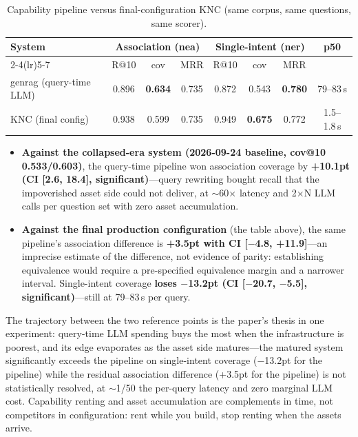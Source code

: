 \documentclass[sigconf,nonacm]{acmart}
\begin{document}
\begin{table}[!t]
\centering
\caption{Capability pipeline versus final-configuration KNC (same
corpus, same questions, same scorer).}
\label{tab:genrag}
\small
\begin{tabular}{lccccccc}
\toprule
\multirow{2}{*}{System} & \multicolumn{3}{c}{Association (nea)} & \multicolumn{3}{c}{Single-intent (ner)} & \multirow{2}{*}{p50} \\
\cmidrule(lr){2-4}\cmidrule(lr){5-7}
 & R@10 & cov & MRR & R@10 & cov & MRR &  \\
\midrule
genrag (query-time LLM) & 0.896 & \textbf{0.634} & 0.735 & 0.872 & 0.543 & \textbf{0.780} & 79--83\,s \\
KNC (final config) & 0.938 & 0.599 & 0.735 & 0.949 & \textbf{0.675} & 0.772 & 1.5--1.8\,s \\
\bottomrule
\end{tabular}
\end{table}

\begin{itemize}
\item \textbf{Against the collapsed-era system (2026-09-24 baseline,
cov@10 0.533/0.603)}, the query-time pipeline won association coverage
by \textbf{+10.1pt (CI [2.6, 18.4], significant)}---query rewriting
bought recall that the impoverished asset side could not deliver, at
${\sim}$60$\times$ latency and 2$\times$N LLM calls per question set
with zero asset accumulation.
\item \textbf{Against the final production configuration} (the table
above), the same pipeline's association difference is \textbf{+3.5pt
with CI [$-$4.8, +11.9]}---an imprecise estimate of the difference, not
evidence of parity: establishing equivalence would require a
pre-specified equivalence margin and a narrower interval. Single-intent
coverage \textbf{loses $-$13.2pt (CI [$-$20.7, $-$5.5], significant)}---still at
79--83\,s per query.
\end{itemize}

The trajectory between the two reference points is the paper's thesis
in one experiment: query-time LLM spending buys the most when the
infrastructure is poorest, and its edge evaporates as the asset side
matures---the matured system significantly exceeds the pipeline on
single-intent coverage ($-$13.2pt for the pipeline) while the residual
association difference (+3.5pt for the pipeline) is not statistically
resolved, at ${\sim}$1/50
the per-query latency and zero marginal LLM cost. Capability renting
and asset accumulation are complements in time, not competitors in
configuration: rent while you build, stop renting when the assets
arrive.
\end{document}
